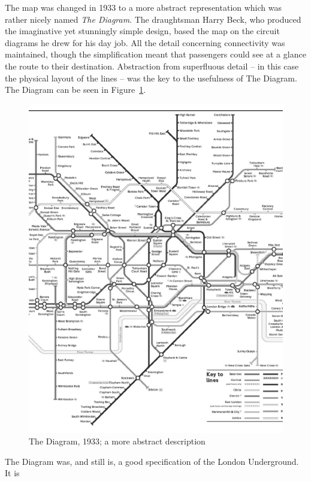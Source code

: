 \noindent
The map was changed in 1933 to a more abstract representation which was 
rather nicely named \emph{The Diagram}. 
The draughtsman Harry Beck, who produced the imaginative yet stunningly 
simple design, based the map on the circuit diagrams he drew for his day 
job. All the detail concerning connectivity
was maintained, though the simplification meant that passengers could 
see at a glance the route to their destination. Abstraction from 
superfluous detail -- in this case the physical layout of the lines -- was 
the key to the usefulness of The Diagram. The Diagram 
can be seen in Figure~\ref{train2}. \\



\begin{figure}
\centering
\includegraphics[width=5in]{tube_map}
  \caption{\small The Diagram, 1933; a more abstract description 
           \label{train2}}
\end{figure}

The Diagram was, and still is, a good specification of the London 
Underground. It is 

